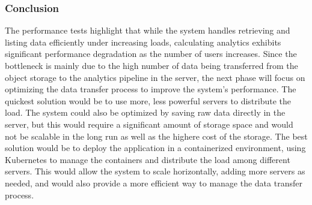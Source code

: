 \subsubsection{Conclusion}
The performance tests highlight that while the system handles retrieving and listing data efficiently under increasing loads, calculating analytics exhibits significant performance degradation as the number of users increases. Since the bottleneck is mainly due to the high number of data being transferred from the object storage to the analytics pipeline in the server, the next phase will focus on optimizing the data transfer process to improve the system's performance. The quickest solution would be to use more, less powerful servers to distribute the load. The system could also be optimized by saving raw data directly in the server, but this would require a significant amount of storage space and would not be scalable in the long run as well as the highere cost of the storage. The best solution would be to deploy the application in a containerized environment, using Kubernetes to manage the containers and distribute the load among different servers. This would allow the system to scale horizontally, adding more servers as needed, and would also provide a more efficient way to manage the data transfer process.
